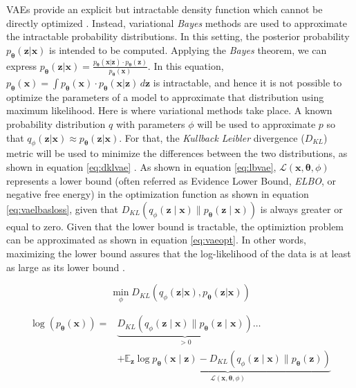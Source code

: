 VAEs provide an explicit but intractable density function which cannot be directly optimized \autocite{Goodfellow2016}. Instead, variational \textit{Bayes} methods are used to approximate the intractable probability distributions. In this setting, the posterior probability $p_\mathbf{\theta}(\mathbf{z}|\mathbf{x})$ is intended to be computed. Applying the \textit{Bayes} theorem, we can express $p_\mathbf{\theta}(\mathbf{z}|\mathbf{x}) = \frac{p_\mathbf{\theta}(\mathbf{x}|\mathbf{z}) \cdot p_\mathbf{\theta}(\mathbf{z})}{p_\mathbf{\theta}(\mathbf{x})}$. In this equation, $p_\mathbf{\theta}(\mathbf{x}) = \int{p_\mathbf{\theta}(\mathbf{x}) \cdot p_\mathbf{\theta}(\mathbf{x}|\mathbf{z})} \,d\mathbf{z}$ is intractable, and hence it is not possible to optimize the parameters of a model to approximate that distribution using maximum likelihood. Here is where variational methods take place. A known probability distribution $q$ with parameters $\phi$ will be used to approximate $p$ so that $q_\phi(\mathbf{z}|\mathbf{x}) \approx p_\mathbf{\theta}(\mathbf{z}|\mathbf{x})$. For that, the \textit{Kullback Leibler} divergence ($D_{KL}$) metric will be used to minimize the differences between the two distributions, as shown in equation \ref{eq:dklvae} \autocite{kingma2019}. As shown in equation \ref{eq:lbvae}, $\mathcal{L}(\mathbf{x}, \mathbf{\theta}, \phi)$ represents a lower bound (often referred as Evidence Lower Bound, \textit{ELBO}, or negative free energy) in the optimization function as shown in equation \ref{eq:vaelbasloss}, given that $D_{K L}\left(q_{\phi}(\mathbf{z} \mid \mathbf{x}) \| p_{\mathbf{\theta}}(\mathbf{z} \mid \mathbf{x})\right)$ is always greater or equal to zero. Given that the lower bound is tractable, the optimiztion problem can be approximated as shown in equation \ref{eq:vaeopt}. In other words, maximizing the lower bound assures that the log-likelihood of the data is at least as large as its lower bound \autocite{wei2021}.

\begin{equation}
\label{eq:dklvae}
\min_{\phi} D_{KL}\left(q_\phi(\mathbf{z}|\mathbf{x}), p_\mathbf{\theta}(\mathbf{z}|\mathbf{x})\right)
\end{equation}

\begin{equation}
\label{eq:lbvae}
\begin{aligned}
\log \left(p_{\mathbf{\theta}}(\mathbf{x})\right) =& \underbrace{D_{K L}\left(q_{\phi}(\mathbf{z} \mid \mathbf{x}) \| p_{\mathbf{\theta}}(\mathbf{z} \mid \mathbf{x})\right)}_{>0} \ldots \\
&+\underbrace{\mathbb{E}_{\mathbf{z}} \log p_{\mathbf{\theta}}(\mathbf{x} \mid \mathbf{z})-D_{K L}\left(q_{\phi}(\mathbf{z} \mid \mathbf{x}) \| p_{\mathbf{\theta}}(\mathbf{z})\right)}_{\mathcal{L}(\mathbf{x}, \mathbf{\theta}, \phi)}
\end{aligned}
\end{equation}

